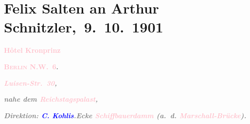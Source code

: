 

\renewcommand{\erwaehntePersonen}{Personen: Carl Kohlis, Olga Schnitzler}
\renewcommand{\erwaehnteInstitutionen}{Institutionen: Jung-Wiener Theater zum Lieben Augustin}
\renewcommand{\erwaehnteOrte}{Orte: Berlin, Hotel Kronprinz, Jung-Wiener Theater zum Lieben Augustin, Luisenstraße, Marschallbrücke, Reichstag, Schiffbauerdamm, Wien}
\renewcommand{\erwaehnteWerke}{Werke: Die Insel. Monatsschrift mit Buchschmuck und Illustrationen, Schlange}
\section[ Felix Salten an Arthur Schnitzler, 9. 10. 1901]{Felix Salten an Arthur Schnitzler, 9. 10. 1901}
\nopagebreak{}
\rehead{ }\normalsize\beginnumbering{}
\toendnotes[C]{\smallbreak\pagebreak[2]}
\toendnotes[C]{\smallbreak}
\pstart
           \noindent{}\centering{}{\pb}\textcolor{gray}{\textbf{\textcolor{pink}{Hôtel Kronprinz}{}\ledrightnote{\textcolor{pink}{Hotel Kronprinz}}}}\pend
           
\pstart
           \noindent{}\centering{}\textcolor{gray}{\textbf{\textcolor{pink}{\textsc{Berlin} N.W. 6}{}\ledrightnote{\textcolor{pink}{Berlin}}.}}\pend
           
\pstart
           \noindent{}\raggedleft{}\textcolor{gray}{\textbf{\emph{\textcolor{pink}{Luisen-Str. 30}{}\ledrightnote{\textcolor{pink}{Luisenstraße}},}}}\pend
           
\pstart
           \noindent{}\raggedleft{}\textcolor{gray}{\textbf{\emph{nahe dem \textcolor{pink}{Reichstagspalast}{}\ledrightnote{\textcolor{pink}{Reichstag}},}}}\pend
           
\pstart
           \noindent{}\textcolor{gray}{\textbf{\emph{Direktion: \textcolor{blue}{C.
                              Kohlis}{}\ledrightnote{\textcolor{blue}{Carl Kohlis}}.}}}\hfill \textcolor{gray}{\textbf{\emph{Ecke \textcolor{pink}{Schiffbauerdamm}{}\ledrightnote{\textcolor{pink}{Schiffbauerdamm}} (a. d. \textcolor{pink}{Marschall-Brücke}{}\ledrightnote{\textcolor{pink}{Marschallbrücke}}).}}}\pend
           
